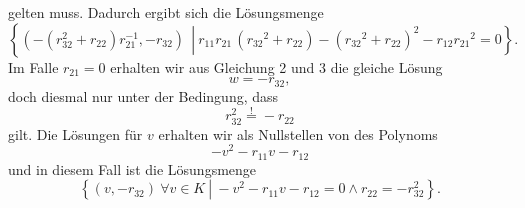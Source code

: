 \documentclass[a4paper,oneside, 11pt, openany%
]{article}
\theoremstyle{custom}
\theoremstyle{custom}
\begin{document}
gelten muss.
Dadurch ergibt sich die Lösungsmenge
\begin{equation*}
	\left\lbrace \left(-\left( r_{32}^2+r_{22}\right) r_{21}^{-1},-r_{32}\right)\ \ \left| \ r_{11}r_{21}\,\left({r_{32}}^2+r_{22}\right)-{\left({r_{32}}^2+r_{22}\right)}^2-r_{12}{r_{21}}^2=0 \right.\right\rbrace .
\end{equation*} 
Im Falle $r_{21} = 0$ erhalten wir aus Gleichung 2 und 3 die gleiche Lösung
\begin{equation}
	w = -r_{32},
\end{equation}  doch diesmal nur unter der Bedingung, dass
\begin{equation}
	r_{32}^2\overset{!}{=}-r_{22}
\end{equation}
gilt.
Die Lösungen für $v$ erhalten wir als Nullstellen von des Polynoms
\begin{equation}
	-v^2-r_{11}v-r_{12}
\end{equation}
und in diesem Fall ist die Lösungsmenge
\begin{equation*}
	\left\lbrace (v,-r_{32}) \ \forall v \in K \ \left| \ -v^2-r_{11}v-r_{12} = 0 \wedge r_{22}=-r_{32}^2 \right.\right\rbrace .
\end{equation*}
\end{document}
